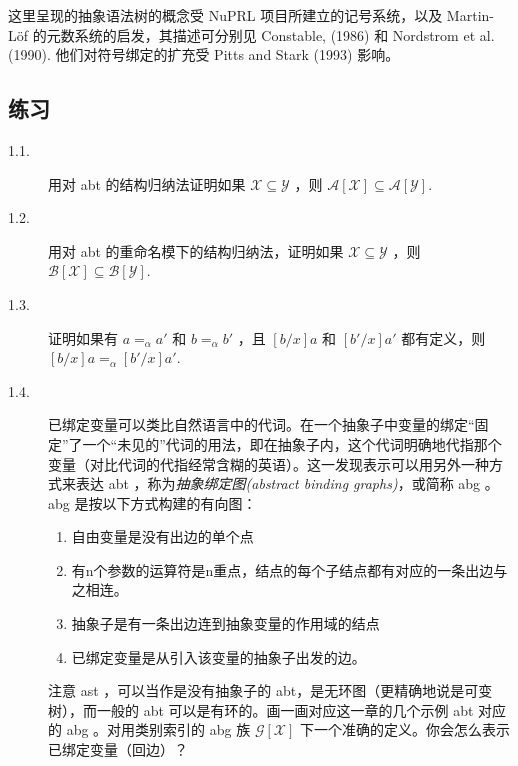 这里呈现的抽象语法树的概念受 NuPRL 项目所建立的记号系统，以及 Martin-Löf 的元数系统的启发，其描述可分别见 Constable, (1986) 和 Nordstrom et al. (1990). 他们对符号绑定的扩充受 Pitts and Stark (1993) 影响。

\subsection{练习}

\begin{description}
\item[1.1.] 用对 abt 的结构归纳法证明如果 \(\mathcal{X} \subseteq \mathcal{Y}\)
，则 \(\mathcal{A[X]} \subseteq \mathcal{A[Y]}\).

\item[1.2.] 用对 abt 的重命名模下的结构归纳法，证明如果
\(\mathcal{X} \subseteq \mathcal{Y}\) ，则
\(\mathcal{B[X]} \subseteq \mathcal{B[Y]}\).

\item[1.3.] 证明如果有 \(a=_\alpha a'\) 和 \(b=_\alpha b'\) ，且 \([b/x]a\) 和
\([b'/x]a'\) 都有定义，则 \([b/x]a=_\alpha [b'/x]a'\).

\item[1.4.]
已绑定变量可以类比自然语言中的代词。在一个抽象子中变量的绑定``固定''了一个``未见的''代词的用法，即在抽象子内，这个代词明确地代指那个变量（对比代词的代指经常含糊的英语）。这一发现表示可以用另外一种方式来表达
abt ，称为\emph{抽象绑定图(abstract binding graphs)}，或简称 abg 。 abg
是按以下方式构建的有向图：

\begin{enumerate}
\def\labelenumi{\arabic{enumi}.}
\item
  自由变量是没有出边的单个点
\item
  有n个参数的运算符是n重点，结点的每个子结点都有对应的一条出边与之相连。
\item
  抽象子是有一条出边连到抽象变量的作用域的结点
\item
  已绑定变量是从引入该变量的抽象子出发的边。
\end{enumerate}

注意 ast ，可以当作是没有抽象子的
abt，是无环图（更精确地说是可变树），而一般的 abt
可以是有环的。画一画对应这一章的几个示例 abt 对应的 abg 。对用类别索引的
abg 族 \(\mathcal{G[X]}\)
下一个准确的定义。你会怎么表示已绑定变量（回边）？
\end{description}